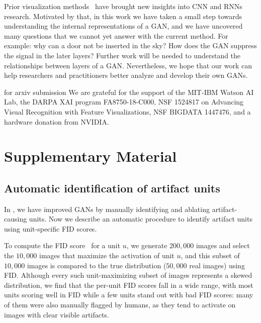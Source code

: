 \documentclass{article} %
\def\arxiv{for arxiv submission}
\begin{document}
Prior visualization methods~\citep{zeiler2014visualizing,bau2017network,karpathy2016visualizing} have brought new insights into CNN and RNNs research. Motivated by that, in this work we have taken a small step towards understanding the internal representations of a GAN, and we have uncovered many questions that we cannot yet answer with the current method. For example: why can a door not be inserted in the sky? How does the GAN suppress the signal in the later layers?  Further work will be needed to understand the relationships between layers of a GAN. Nevertheless, we hope that our work can help researchers and practitioners better analyze and develop their own GANs. 

\ifdefined\arxiv%
We are grateful for the support of the MIT-IBM Watson AI Lab, the DARPA XAI program FA8750-18-C000, NSF 1524817 on Advancing Visual Recognition with Feature Visualizations, NSF BIGDATA 1447476, and a hardware donation from NVIDIA.
\else\author{}\fi

\clearpage




\clearpage\renewcommand{\thesection}{S-\arabic{section}}\section{Supplementary Material}\subsection{Automatic identification of artifact units}

In , we have improved GANs by manually identifying and ablating artifact-causing units. Now we describe an automatic procedure to identify artifact units using unit-specific FID scores.

To compute the FID score~\citep{heusel2017gans} for a unit $u$, we generate $200,000$ images and select the $10,000$ images that maximize the activation of unit $u$, and this subset of $10,000$ images is compared to the true distribution ($50, 000$ real images) using FID.  Although every such unit-maximizing subset of images represents a skewed distribution, we find that the per-unit FID scores fall in a wide range, with most units scoring well in FID while a few units stand out with bad FID scores: many of them were also manually flagged by humans, as they tend to activate on images with clear visible artifacts.
\end{document}
